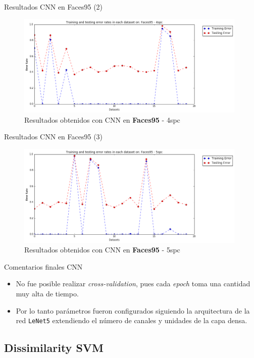 \documentclass{beamer}
\begin{document}
\begin{frame}{Resultados CNN en Faces95 (2)}
\begin{figure}[htpb!]
\centering
\includegraphics[width=11cm]{convolution_8}
\caption{Resultados obtenidos con CNN en \textbf{Faces95} - 4spc}
\end{figure}
\end{frame}

\begin{frame}{Resultados CNN en Faces95 (3)}
\begin{figure}[htpb!]
\centering
\includegraphics[width=11cm]{convolution_9}
\caption{Resultados obtenidos con CNN en \textbf{Faces95} - 5spc}
\end{figure}
\end{frame}


\begin{frame}{Comentarios finales CNN}
\begin{itemize}
  \item No fue posible realizar \textit{cross-validation}, pues cada \textit{epoch} toma una cantidad muy alta de tiempo.
  \item Por lo tanto parámetros fueron configurados siguiendo la arquitectura de la red \texttt{LeNet5} extendiendo
  el número de canales y unidades de la capa densa.
\end{itemize}
\end{frame}



\subsection{Dissimilarity SVM}
\end{document}
